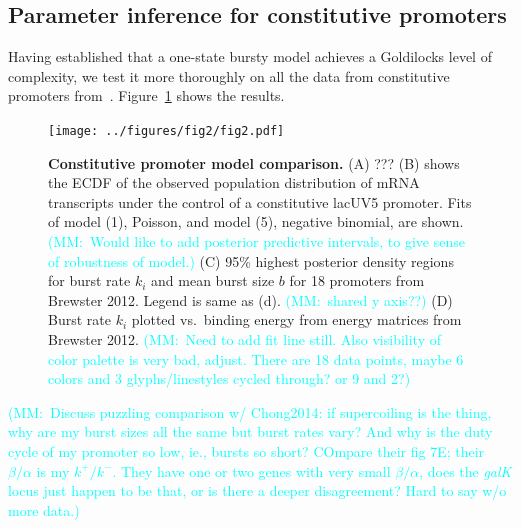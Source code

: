 \documentclass[12pt]{article}%
\newcommand{\mmnote}[1]{\textcolor{cyan}{(MM:~#1)}}
\newcommand{\fig}[1]{Figure~\ref{#1}}
\begin{document}
\subsection{Parameter inference for constitutive promoters}
Having established that a one-state bursty model achieves a
Goldilocks level of complexity, we test it more thoroughly on all
the data from constitutive promoters from~\cite{Jones2014}.
\fig{fig:constit_post} shows the results.
\begin{figure}%
\centering
\texttt{[image: ../figures/fig2/fig2.pdf]}
\caption{\textbf{Constitutive promoter model comparison.}
    (A) ???
    (B) shows the ECDF of the observed population distribution
    of mRNA transcripts under the control of a constitutive lacUV5 promoter.
    Fits of model (1), Poisson, and model (5), negative binomial, are shown.
    \mmnote{Would like to add posterior predictive intervals,
    to give sense of robustness of model.}
    (C) 95\% highest posterior density regions for burst rate $k_i$ and
    mean burst size $b$ for 18 promoters from Brewster 2012. Legend is
    same as (d).
    \mmnote{shared y axis??}
    (D) Burst rate $k_i$ plotted vs.\ binding energy from energy
    matrices from Brewster 2012.
    \mmnote{Need to add fit line still. Also visibility of color palette is very bad, adjust.
    There are 18 data points, maybe 6 colors and 3 glyphs/linestyles
    cycled through? or 9 and 2?}
    }
\label{fig:constit_post}
\end{figure}
\mmnote{Discuss puzzling comparison w/ Chong2014: if supercoiling is the thing, why are my burst sizes all the same but burst rates vary? And why is the duty cycle of my promoter so low, ie., bursts so short? COmpare their fig 7E; their $\beta/\alpha$ is my $k^+/k^-$. They have one or two genes with very small $\beta/\alpha$, does the \textit{galK} locus just happen to be that, or is there a deeper disagreement? Hard to say w/o more data.}
\end{document}
